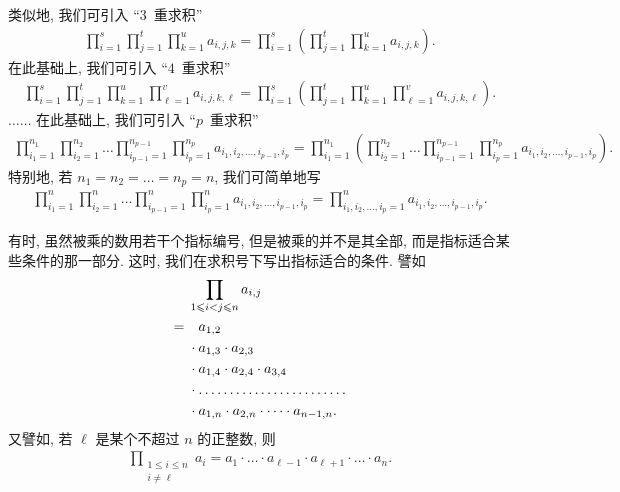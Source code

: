 \documentclass[%
    UTF8,%
    fontset=none,%
    punct=kaiming,%
    zihao=-4,%
    a4paper,%
    oneside,%
]{ctexbook}
\renewcommand*{\leq}{\leqslant}
\begin{document}
类似地, 我们可引入 ``\(3\)~重求积''
\begin{align*}
    \prod_{i = 1}^{s} {
    \prod_{j = 1}^{t} {
    \prod_{k = 1}^{u} {
    a_{i,j,k} }}}
    =
    \prod_{i = 1}^{s}
    {\left(
    \prod_{j = 1}^{t} {
        \prod_{k = 1}^{u} {
            a_{i,j,k} }}
    \right)}.
\end{align*}
在此基础上, 我们可引入 ``\(4\)~重求积''
\begin{align*}
    \prod_{i = 1}^{s} {
    \prod_{j = 1}^{t} {
    \prod_{k = 1}^{u} {
    \prod_{\ell = 1}^{v} {
    a_{i,j,k,\ell} }}}}
    =
    \prod_{i = 1}^{s}
    {\left(
    \prod_{j = 1}^{t} {
        \prod_{k = 1}^{u} {
            \prod_{\ell = 1}^{v} {
                a_{i,j,k,\ell} }}}
    \right)}.
\end{align*}
\(\dots \dots\)
在此基础上, 我们可引入 ``\(p\)~重求积''
\begin{align*}
    \prod_{i_1 = 1}^{n_1} {
    \prod_{i_2 = 1}^{n_2} {
    \dots
    \prod_{i_{p-1} = 1}^{n_{p-1}} {
    \prod_{i_p = 1}^{n_p} {
    a_{i_1,i_2,\dots,i_{p-1},i_p} }}}}
    = \prod_{i_1 = 1}^{n_1}
    {\left(
    \prod_{i_2 = 1}^{n_2} {
        \dots
        \prod_{i_{p-1} = 1}^{n_{p-1}} {
            \prod_{i_p = 1}^{n_p} {
                a_{i_1,i_2,\dots,i_{p-1},i_p} }}}
    \right)}.
\end{align*}
特别地, 若 \(n_1 = n_2 = \dots = n_p = n\),
我们可简单地写
\begin{align*}
    \prod_{i_1 = 1}^{n} {
    \prod_{i_2 = 1}^{n} {
    \dots
    \prod_{i_{p-1} = 1}^{n} {
    \prod_{i_p = 1}^{n} {
    a_{i_1,i_2,\dots,i_{p-1},i_p} }}}}
    =
    \prod_{i_1,i_2,\dots,i_p = 1}^{n}
    {a_{i_1,i_2,\dots,i_{p-1},i_p}}.
\end{align*}

有时, 虽然被乘的数用若干个指标编号,
但是被乘的并不是其全部,
而是指标适合某些条件的那一部分.
这时, 我们在求积号下写出指标适合的条件.
譬如
\begin{align*}
         & \prod_{1 \leq i < j \leq n} {a_{i,j}}
    \\
    = {} & \hphantom{{} \cdot {}} a_{1,2}
    \\
         & \cdot a_{1,3} \cdot a_{2,3}
    \\
         & \cdot a_{1,4} \cdot a_{2,4} \cdot a_{3,4}
    \\
         & \cdot
    \dots \dots \dots \dots
    \dots \dots \dots \dots
    \\
         & \cdot a_{1,n} \cdot a_{2,n}
    \cdot \dots \cdot a_{n-1,n}.
\end{align*}
又譬如, 若 \(\ell\) 是某个不超过 \(n\) 的正整数, 则
\begin{align*}
    \prod_{\substack{1 \leq i \leq n \\i \neq \ell}}
    {a_i}
    = a_1 \cdot \dots \cdot a_{\ell-1}
    \cdot a_{\ell+1} \cdot \dots \cdot a_n.
\end{align*}
\end{document}
